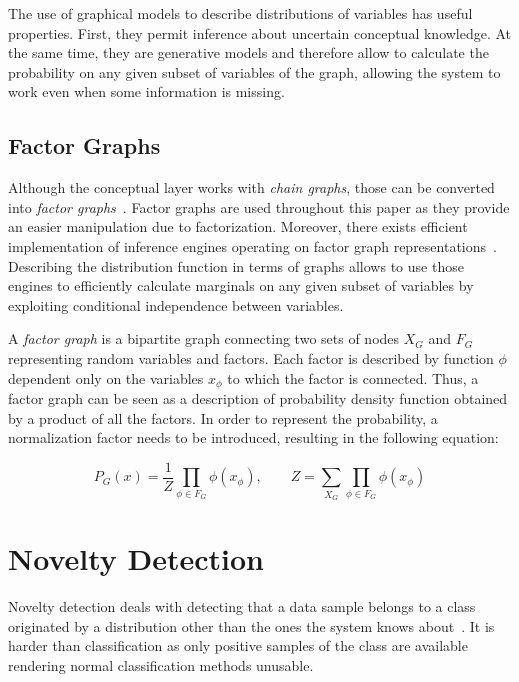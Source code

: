 \documentclass[runningheads,a4paper]{llncs}
\begin{document}
The use of graphical models to describe distributions of variables has useful properties.
First, they permit inference about uncertain conceptual knowledge. At the same time, they are 
generative models and therefore allow to calculate the probability
on any given subset of variables of the graph, allowing the system to work even when some
information is missing.


\subsection{Factor Graphs}
Although the conceptual layer works with \emph{chain graphs}, those can be converted
into \emph{factor graphs}~\cite{kschischang2001factor}. Factor graphs are used throughout this paper as they provide an
easier manipulation due to factorization.
Moreover, there exists efficient implementation of inference engines operating on factor graph
representations~\cite{Mooij_libDAI_10}.
Describing the distribution function in terms of graphs allows to use those engines to
efficiently calculate marginals on any given subset of variables by exploiting conditional
independence between variables.

A \emph{factor graph} is a bipartite graph connecting two sets of nodes $X_G$ and $F_G$
representing random variables and factors.
Each factor is described by function $\phi$ dependent only on the variables $x_\phi$
to which the factor is connected.
Thus, a factor graph can be seen as a description of probability density function obtained
by a product of all the factors. In order to represent the probability,
a normalization factor needs to be introduced, resulting in the following equation:

\begin{equation}
P_G(x) = \frac{1}{Z}\prod_{\phi \in F_G}{\phi(x_{\phi})},\qquad
Z = \sum_{X_G}\prod_{\phi \in F_G}{\phi(x_{\phi})}
\end{equation}


\section{Novelty Detection}
\label{sec:novelty-detection}
Novelty detection deals with detecting that a data sample belongs to a class
originated by a distribution other than the ones the system knows about~\cite{markou2003novelty}.
It is harder than classification as only positive samples of the class are available
rendering normal classification methods unusable.
\end{document}
